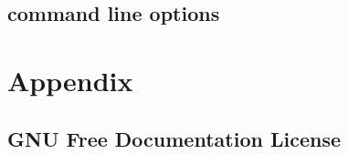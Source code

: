 \documentclass[UTF8]{ctexrep}
\begin{document}


\chapter{\spatch command line options}




\part{Appendix}

\chapter*{GNU Free Documentation License}



{\small


}


\end{document}
